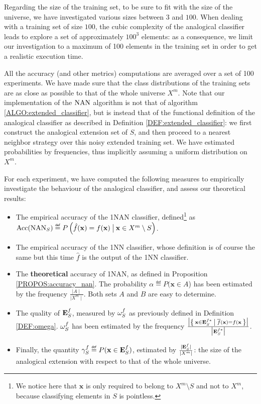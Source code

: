 Regarding the size of the training set, to be sure to fit with the size of the
universe, we have investigated various sizes between $3$ and $100$. When
dealing with a training set of size $100$, the cubic complexity of the
analogical classifier leads to explore a set of approximately $100^3$ elements:
as a consequence, we limit our investigation to a maximum of 100 elements in
the training set in order to get a realistic execution time.

All the accuracy (and other metrics) computations are averaged over a set of
100 experiments. We have made sure that the class distributions of the training
sets are as close as possible to that of the whole universe $X^m$.  Note that
our implementation of the $\mbox{NAN}$ algorithm is not that of algorithm
\ref{ALGO:extended_classifier}, but is instead that of the functional
definition of the analogical classifier as described in Definition
\ref{DEF:extended_classifier}: we first construct the analogical extension set
of $S$, and then proceed to a nearest neighbor strategy over this noisy
extended training set. We have estimated probabilities by frequencies, thus
implicitly assuming a uniform distribution on $X^m$.

For each experiment, we have computed the following measures to empirically
investigate the behaviour of the analogical classifier, and assess our
theoretical results:
\begin{itemize}
  \item The empirical accuracy of the 1NAN classifier, defined\footnote{We
    notice here that $\mathbf{x}$ is only required to belong to $X^m \setminus
    S$ and not to $X^m$, because classifying elements in $S$ is pointless.}
    as\\
    $\acc(\NAN_S) \eqdef P\left(\hat{f}(\mathbf{x}) = f(\mathbf{x})
    \given[\big] \mathbf{x} \in X^m \setminus S \right)$.
  \item The empirical accuracy of the 1NN classifier, whose definition is of
    course the same but this time $\hat{f}$ is the output of the 1NN
    classifier.
  \item The \textbf{theoretical} accuracy of 1NAN, as defined in Proposition
    \ref{PROPOS:accuracy_nan}. The probability $\alpha \eqdef P(\mathbf{x} \in
    A$) has been estimated by the frequency $\frac{\mid A \mid}{\mid X^m
    \mid}$. Both sets $A$ and $B$ are easy to determine.
  \item The quality of $\mathbf{E}_{S}^{f}$, measured by $\omega_{S}^{f}$ as previously defined in
    Definition  \ref{DEF:omega}. $\omega_{S}^{f}$ has been estimated by the
    frequency $\frac{\big| \Set{\mathbf{x} \in \mathbf{E}_{S}^{f*}| \overline{f}(\mathbf{x}) =
    f(\mathbf{x}}\big|}{\big| \mathbf{E}_{S}^{f*} \big|}$.
  \item Finally, the quantity $\gamma_S^f \eqdef P(\mathbf{x} \in \esf)$,
    estimated by $\frac{\mid \mathbf{E}_{S}^{f}\mid}{\mid X^m \mid}$: the size of the
    analogical extension with respect to that of the whole universe.
\end{itemize}

